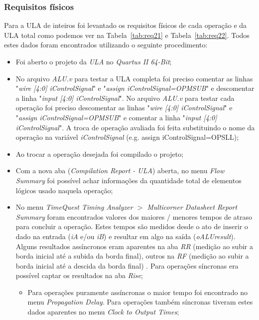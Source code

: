 \documentclass[12pt]{article}
\begin{document}
\subsubsection{Requisitos físicos}
\label{subsubsec:ulafis}

Para a ULA de inteiros foi levantado os requisitos físicos de cada operação e da ULA total como podemos ver na Tabela~\ref{tab:req21} e Tabela~\ref{tab:req22}. Todos estes dados foram encontrados utilizando o seguinte procedimento:

\begin{itemize}
	\item Foi aberto o projeto da \textit{ULA} no \textit{Quartus II 64-Bit};
	\item No arquivo \textit{ALU.v} para testar a ULA completa foi preciso comentar as linhas "\textit{wire [4:0]  iControlSignal}" e "\textit{assign iControlSignal=OPMSUB}" e descomentar a linha "\textit{input [4:0] iControlSignal}". No arquivo \textit{ALU.v} para testar cada operação foi preciso descomentar as linhas "\textit{wire [4:0]  iControlSignal}" e "\textit{assign iControlSignal=OPMSUB}" e comentar a linha "\textit{input [4:0] iControlSignal}". A troca de operação avaliada foi feita substituindo o nome da operação na variável \textit{iControlSignal} (e.g. assign iControlSignal=OPSLL);
	\item Ao trocar a operação desejada foi compilado o projeto;
	\item Com a nova aba (\textit{Compilation Report - ULA}) aberta, no menu \textit{Flow Summary} foi possível achar informações da quantidade total de elementos lógicos usado naquela operação;
	\item No menu \textit{TimeQuest Timing Analyzer $>$ Multicorner Datasheet Report Summary} foram encontrados valores dos maiores / menores tempos de atraso para concluir a operação. Estes tempos são medidos desde o ato de inserir o dado na entrada (\textit{iA} e/ou \textit{iB}) e resultar em algo na saída (\textit{oALUresult}). Alguns resultados assíncronos eram aparentes na aba \textit{RR} (medição ao subir a borda inicial até a subida da borda final), outros na \textit{RF} (medição ao subir a borda inicial até a descida da borda final) \cite{altera}. Para operações síncronas era possível captar os resultados na aba \textit{Rise};
		\begin{itemize}
			\item Para operações puramente assíncronas o maior tempo foi encontrado no menu \textit{Propagation Delay}. Para operações também síncronas tiveram estes dados aparentes no menu \textit{Clock to Output Times}; 

\end{itemize}
\end{itemize}
\end{document}
